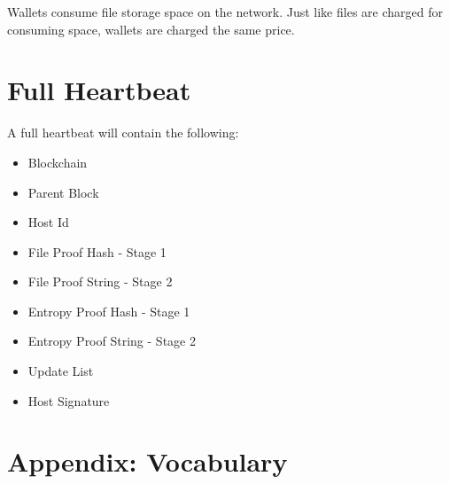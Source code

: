 \documentclass[twocolumn]{article}
\begin{document}
Wallets consume file storage space on the network.
Just like files are charged for consuming space, wallets are charged the same price.

\section{Full Heartbeat}

A full heartbeat will contain the following:

\begin{itemize}
	\item Blockchain
	\item Parent Block
	\item Host Id
	\item File Proof Hash - Stage 1
	\item File Proof String - Stage 2
	\item Entropy Proof Hash - Stage 1
	\item Entropy Proof String - Stage 2
	\item Update List
	\item Host Signature
\end{itemize}

\section{Appendix: Vocabulary}
\end{document}

